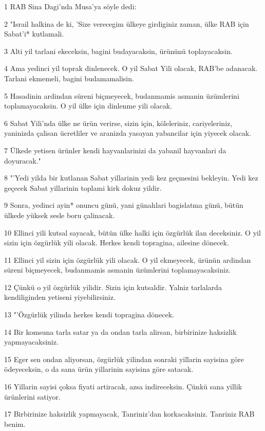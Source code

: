 \par 1 RAB Sina Dagi'nda Musa'ya söyle dedi:
\par 2 "Israil halkina de ki, 'Size verecegim ülkeye girdiginiz zaman, ülke RAB için Sabat'i* kutlamali.
\par 3 Alti yil tarlani ekeceksin, bagini budayacaksin, ürününü toplayacaksin.
\par 4 Ama yedinci yil toprak dinlenecek. O yil Sabat Yili olacak, RAB'be adanacak. Tarlani ekmemeli, bagini budamamalisin.
\par 5 Hasadinin ardindan süreni biçmeyecek, budanmamis asmanin üzümlerini toplamayacaksin. O yil ülke için dinlenme yili olacak.
\par 6 Sabat Yili'nda ülke ne ürün verirse, sizin için, köleleriniz, cariyeleriniz, yaninizda çalisan ücretliler ve aranizda yasayan yabancilar için yiyecek olacak.
\par 7 Ülkede yetisen ürünler kendi hayvanlarinizi da yabanil hayvanlari da doyuracak."
\par 8 "'Yedi yilda bir kutlanan Sabat yillarinin yedi kez geçmesini bekleyin. Yedi kez geçecek Sabat yillarinin toplami kirk dokuz yildir.
\par 9 Sonra, yedinci ayin* onuncu günü, yani günahlari bagislatma günü, bütün ülkede yüksek sesle boru çalinacak.
\par 10 Ellinci yili kutsal sayacak, bütün ülke halki için özgürlük ilan deceksiniz. O yil sizin için özgürlük yili olacak. Herkes kendi topragina, ailesine dönecek.
\par 11 Ellinci yil sizin için özgürlük yili olacak. O yil ekmeyecek, ürünün ardindan süreni biçmeyecek, budanmamis asmanin üzümlerini toplamayacaksiniz.
\par 12 Çünkü o yil özgürlük yilidir. Sizin için kutsaldir. Yalniz tarlalarda kendiliginden yetiseni yiyebilirsiniz.
\par 13 "'Özgürlük yilinda herkes kendi topragina dönecek.
\par 14 Bir komsuna tarla satar ya da ondan tarla alirsan, birbirinize haksizlik yapmayacaksiniz.
\par 15 Eger sen ondan aliyorsan, özgürlük yilindan sonraki yillarin sayisina göre ödeyeceksin, o da sana ürün yillarinin sayisina göre satacak.
\par 16 Yillarin sayisi çoksa fiyati artiracak, azsa indireceksin. Çünkü sana yillik ürünlerini satiyor.
\par 17 Birbirinize haksizlik yapmayacak, Tanriniz'dan korkacaksiniz. Tanriniz RAB benim.
